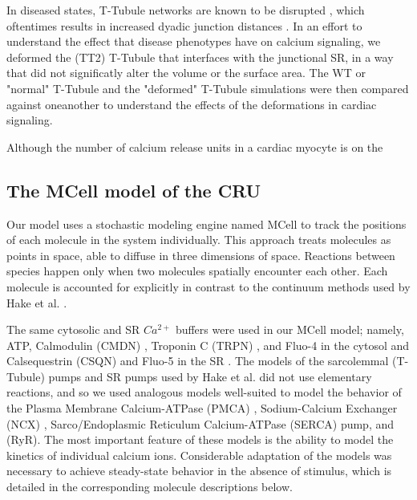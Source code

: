 \documentclass[12pt]{ucsddissertation}
\begin{document}
In diseased states, T-Tubule networks are known to be disrupted \cite{Louch2010,Ibrahim2011,Crossman2015}, which oftentimes results in increased dyadic junction distances \cite{Polakova2013}. In an effort to understand the effect that disease phenotypes have on calcium signaling, we deformed the (TT2) T-Tubule that interfaces with the junctional SR, in a way that did not significatly alter the volume or the surface area. The WT or "normal" T-Tubule and the "deformed" T-Tubule simulations were then compared against oneanother to understand the effects of the deformations in cardiac signaling. 

Although the number of calcium release units in a cardiac myocyte is on the 

\subsection{The MCell model of the CRU}
Our model uses a stochastic modeling engine named MCell \cite{Stiles2001a,Kerr2008,Czech2009} to track the positions of each molecule in the system individually. This approach treats molecules as points in space, able to diffuse in three dimensions of space. Reactions between species happen only when two molecules spatially encounter each other. Each molecule is accounted for explicitly in contrast to the continuum methods used by Hake et al. \cite{Hake2012}. 

The same cytosolic and SR $Ca^{2+}$ buffers were used in our MCell model; namely, ATP\cite{Bers2001,Picht2011,Hake2012}, Calmodulin (CMDN) \cite{Robertson1981,Fabiato1983,Michailova2002,Picht2011}, Troponin C (TRPN) \cite{Bondarenko2004}, and  Fluo-4 \cite{Picht2011} in the cytosol and Calsequestrin (CSQN)\cite{Shannon1997,Bers2001,Picht2011} and Fluo-5 in the SR \cite{Picht2011}. The models of the sarcolemmal (T-Tubule) pumps and SR pumps used by Hake et al. did not use elementary reactions, and so we used analogous models well-suited to model the behavior of the Plasma Membrane Calcium-ATPase (PMCA) \cite{Penheiter2003,Brini2009,Bartol2015}, Sodium-Calcium Exchanger (NCX) \cite{Hilgemann1991,Bartol2015}, Sarco/Endoplasmic Reticulum Calcium-ATPase (SERCA) pump\cite{Higgins2006,Bartol2015}, and (RyR)\cite{Saftenku2001}. The most important feature of these models is the ability to model the kinetics of individual calcium ions. Considerable adaptation of the models was necessary to achieve steady-state behavior in the absence of stimulus, which is detailed in the corresponding molecule descriptions below.
\end{document}
